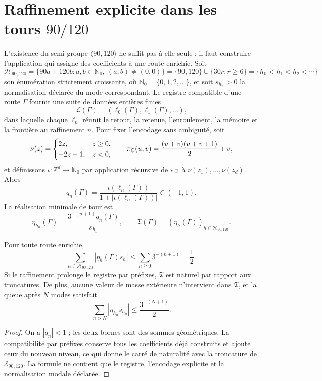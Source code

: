 \section{Raffinement explicite dans les tours \texorpdfstring{\(90/120\)}{90/120}}

L'existence du semi-groupe \(\langle90,120\rangle\) ne suffit pas à elle seule :
il faut construire l'application qui assigne des coefficients à une route enrichie. Soit
\[
 \mathcal H_{90,120}
 =\{90a+120b:a,b\in\mathbb N_0,\ (a,b)\ne(0,0)\}
 =\{90,120\}\cup\{30r:r\geq6\}
 =\{h_0<h_1<h_2<\cdots\}
\]
son énumération strictement croissante, où \(\mathbb N_0=\{0,1,2,\ldots\}\),
et soit \(s_{h_n}>0\) la normalisation déclarée du mode correspondant. Le
registre compatible d'une route
\(\Gamma\) fournit une suite de données entières finies
\[
 \mathcal L(\Gamma)=(\ell_0(\Gamma),\ell_1(\Gamma),\ldots),
\]
dans laquelle chaque \(\ell_n\) réunit le retour, la retenue, l'enroulement, la mémoire et la frontière
au raffinement \(n\). Pour fixer l'encodage sans ambiguïté, soit
\[
 \nu(z)=
 \begin{cases}2z,&z\geq0,\\-2z-1,&z<0,\end{cases}
 \qquad
 \pi_{\rm C}(u,v)=\frac{(u+v)(u+v+1)}2+v,
\]
et définissons \(\iota:\mathbb Z^d\to\mathbb N_0\) par application récursive de
\(\pi_{\rm C}\) à \(\nu(z_1),\ldots,\nu(z_d)\). Alors
\[
 q_n(\Gamma)
 =\frac{\iota(\ell_n(\Gamma))}
 {1+|\iota(\ell_n(\Gamma))|}\in(-1,1).
\]
La réalisation minimale de tour est
\[
 \eta_{h_n}(\Gamma)
 =\frac{3^{-(n+1)}q_n(\Gamma)}{s_{h_n}},
 \qquad
 \mathfrak T(\Gamma)
 =(\eta_h(\Gamma))_{h\in\mathcal H_{90,120}}.
\]

\begin{theorem}
Pour toute route enrichie,
\[
 \sum_{h\in\mathcal H_{90,120}}|\eta_h(\Gamma)s_h|
 \leq\sum_{n\ge0}3^{-(n+1)}=\frac12.
\]
Si le raffinement prolonge le registre par préfixes, \(\mathfrak T\) est naturel
par rapport aux troncatures. De plus, aucune valeur de masse extérieure n'intervient
dans \(\mathfrak T\), et la queue après \(N\) modes satisfait
\[
 \sum_{n>N}|\eta_{h_n}s_{h_n}|
 \leq\frac{3^{-(N+1)}}2.
\]
\end{theorem}

\begin{proof}
On a \(|q_n|<1\) ; les deux bornes sont des sommes géométriques. La compatibilité
par préfixes conserve tous les coefficients déjà construits et ajoute ceux du
nouveau niveau, ce qui donne le carré de naturalité avec la troncature de
\(\mathcal E_{90,120}\). La formule ne contient que le registre, l'encodage
explicite et la normalisation modale déclarée.
\end{proof}


